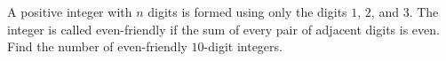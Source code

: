 A positive integer with $n$ digits is formed using only the digits $1$, $2$, and $3$. The integer is called even-friendly if the sum of every pair of adjacent digits is even. Find the number of even-friendly $10$-digit integers.
